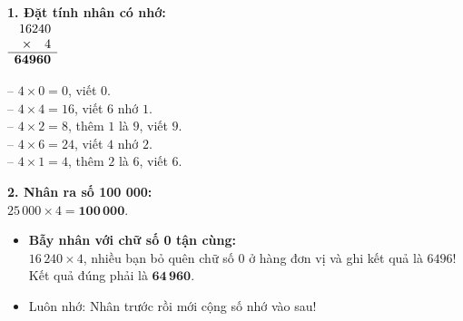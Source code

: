 \documentclass[11pt,a4paper]{article}
\begin{document}
\vspace{-2.5mm}
\noindent
\begin{minipage}[t]{0.49\textwidth}\vspace{0pt}
\begin{tcolorbox}[
  enhanced,
  colback=green!4!white,
  colframe=green!60!black,
  arc=2mm, boxrule=0.8pt,
  left=2mm, right=2mm, top=1.8mm, bottom=1.8mm,
  title={\footnotesize\bfseries\color{white}\faCheckCircle\ Ví dụ thực hành chuẩn mực}
]
{\footnotesize
\textbf{1. Đặt tính nhân có nhớ:}\\
$\begin{array}{r@{}l}
  16240 & \\
  \times\quad 4 & \\
  \hline
  \mathbf{64960} &
\end{array}$
\qquad
\begin{minipage}[c]{0.5\linewidth}
-- $4 \times 0 = 0$, viết $0$.\\
-- $4 \times 4 = 16$, viết $6$ nhớ $1$.\\
-- $4 \times 2 = 8$, thêm $1$ là $9$, viết $9$.\\
-- $4 \times 6 = 24$, viết $4$ nhớ $2$.\\
-- $4 \times 1 = 4$, thêm $2$ là $6$, viết $6$.
\end{minipage}

\textbf{2. Nhân ra số 100 000:}\\
$25\,000 \times 4 = \mathbf{100\,000}$.
}
\end{tcolorbox}
\end{minipage}
\hfill
\begin{minipage}[t]{0.49\textwidth}\vspace{0pt}
\begin{tcolorbox}[
  enhanced,
  colback=red!4!white,
  colframe=red!70!black,
  arc=2mm, boxrule=0.8pt,
  left=2mm, right=2mm, top=1.8mm, bottom=1.8mm,
  title={\footnotesize\bfseries\color{white}\faExclamationTriangle\ Mẹo tránh bẫy trắc nghiệm}
]
{\footnotesize
\begin{itemize}\setlength{\itemsep}{1.5pt}\setlength{\leftskip}{-2.5mm}
  \item \textbf{Bẫy nhân với chữ số 0 tận cùng:}\\
  $16\,240 \times 4$, nhiều bạn bỏ quên chữ số $0$ ở hàng đơn vị và ghi kết quả là $6496$! Kết quả đúng phải là $\mathbf{64\,960}$.
  \item Luôn nhớ: Nhân trước rồi mới cộng số nhớ vào sau!
\end{itemize}
}
\end{tcolorbox}
\end{minipage}
\end{document}
